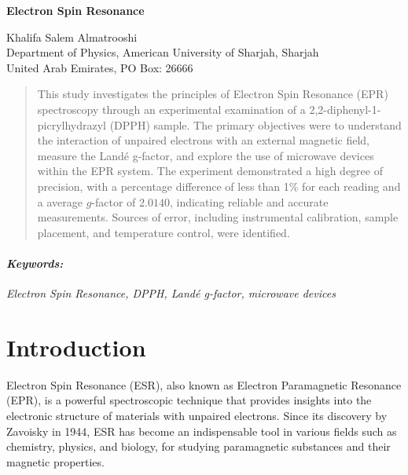 \documentclass[11pt]{article}
\begin{document}
	
	\begin{titlepage}
		\begin{center}
			\begin{Large}
				\textbf{Electron Spin Resonance} \\
			\end{Large}
			\vspace{0.5cm}
			Khalifa Salem Almatrooshi \\
			\vspace{0.5cm}
			Department of Physics, American University of Sharjah, Sharjah \\
			United Arab Emirates, PO Box: 26666
		\end{center}
		\begin{abstract}
			\noindent
			This study investigates the principles of Electron Spin Resonance (EPR) spectroscopy through an experimental examination of a 2,2-diphenyl-1-picrylhydrazyl (DPPH) sample. The primary objectives were to understand the interaction of unpaired electrons with an external magnetic field, measure the Landé g-factor, and explore the use of microwave devices within the EPR system. The experiment demonstrated a high degree of precision, with a percentage difference of less than 1\% for each reading and a average $g$-factor of $2.0140$, indicating reliable and accurate measurements. Sources of error, including instrumental calibration, sample placement, and temperature control, were identified.
		\end{abstract}
		\paragraph{\textit{Keywords:}} \textit{Electron Spin Resonance, DPPH, Landé g-factor, microwave devices}
	\end{titlepage}
	
	\clearpage
	
	\section{Introduction}
	
	Electron Spin Resonance (ESR), also known as Electron Paramagnetic Resonance (EPR), is a powerful spectroscopic technique that provides insights into the electronic structure of materials with unpaired electrons. Since its discovery by Zavoisky in 1944, ESR has become an indispensable tool in various fields such as chemistry, physics, and biology, for studying paramagnetic substances and their magnetic properties.
	
\end{document}
